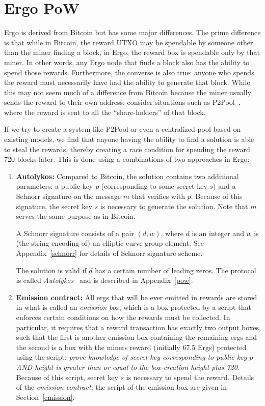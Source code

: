 \documentclass[runningheads]{llncs}
\newcommand{\powname}{Autolykos\xspace}
\begin{document}
\section{Ergo PoW}

Ergo is derived from Bitcoin but has some major differences. The prime difference is that while in Bitcoin, the reward UTXO may be spendable by someone other than the miner finding a block, in Ergo, the reward box is spendable only by that miner. In other words, any Ergo node that finds a block also has the ability to spend those rewards. Furthermore, the converse is also true: anyone who spends the reward must necessarily have had the ability to generate that block. While this may not seem much of a difference from Bitcoin because the miner usually sends the reward to their own address, consider situations such as P2Pool~\cite{p2pool}, where the reward is sent to all the ``share-holders'' of that block. 

If we try to create a system like P2Pool or even a centralized pool based on existing models, we find that anyone having the ability to find a solution is able to steal the rewards, thereby creating a race condition for spending the reward 720 blocks later. This is done using a combinations of two approaches in Ergo:
\begin{enumerate}
	\item \textbf{\powname:} Compared to Bitcoin, the solution contains two additional parameters: a public key $p$ (corresponding to some secret key $s$) and a Schnorr signature on the message $m$ that verifies with $p$. Because of this signature, the secret key $s$ is necessary to generate the solution. Note that $m$ serves the same purpose as in Bitcoin.

	A Schnorr signature consists of a pair $(d, w)$, where $d$ is an integer and $w$ is (the string encoding of) an elliptic curve group element. See Appendix~\ref{schnorr} for details of Schnorr signature scheme. 

	The solution is valid if $d$ has a certain number of leading zeros. 
	The protocol is called {\em \powname}~\cite{autolykos} and is described in Appendix~\ref{pow}.
	\item \textbf{Emission contract:} All ergs that will be ever emitted in rewards are stored in what is called an {\em emission box}, which is a box protected by a script that enforces certain conditions on how the rewards must be collected. In particular, it requires that a reward transaction has exactly two output boxes, such that the first is another emission box containing the remaining ergs and the second is a box with the miners reward (initially 67.5 Ergs) protected using the script: {\em prove knowledge of secret key corresponding to public key $p$ AND height is greater than or equal to the box-creation height plus 720}. 
	Because of this script, secret key $s$ is necessary to spend the reward. 
	Details of the {\em emission contract}, the script of the emission box are given in Section~\ref{emission}.
\end{enumerate} 
\end{document}
